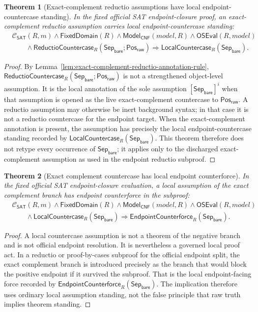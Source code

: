 \documentclass[11pt]{article}
\newtheorem{theorem}{Theorem}[section]
\theoremstyle{definition}
\theoremstyle{remark}
\newcommand{\PosRaw}{\mathsf{Pos}_{\mathsf{raw}}}
\newcommand{\SepBare}{\mathsf{Sep}_{\mathsf{bare}}}
\newcommand{\ClayCtx}{\mathcal{C}_{\mathsf{SAT}}(R,m)}
\newcommand{\FixedDom}{\mathsf{FixedDomain}}
\newcommand{\ModelOfCnf}{\mathsf{Model}_{\mathsf{CNF}}}
\newcommand{\OfficialSATEval}{\mathsf{OSEval}}
\newcommand{\EndpointCounterforce}{\mathsf{EndpointCounterforce}}
\newcommand{\LocalCountercase}{\mathsf{LocalCountercase}}
\newcommand{\ReductioCountercase}{\mathsf{ReductioCountercase}}
\begin{document}
\begin{theorem}[Exact-complement reductio assumptions have local endpoint-countercase standing]
\label{thm:reductio-countercase-yields-local-countercase}
In the fixed official SAT endpoint-closure proof, an exact-complement reductio assumption carries local endpoint-countercase standing:
\[
\begin{aligned}
  &\ClayCtx\wedge\FixedDom(R)\wedge\ModelOfCnf(model,R)\wedge\OfficialSATEval(R,model)\\
  &\qquad\wedge\ReductioCountercase_R(\SepBare;\PosRaw)\Rightarrow \LocalCountercase_R(\SepBare).
\end{aligned}
\]
\end{theorem}

\begin{proof}
By Lemma~\ref{lem:exact-complement-reductio-annotation-rule}, \(\ReductioCountercase_R(\SepBare;\PosRaw)\) is not a strengthened object-level assumption. It is the local annotation of the sole assumption \([\SepBare]^i\) when that assumption is opened as the live exact-complement countercase to \(\PosRaw\). A reductio assumption may otherwise be inert background syntax; in that case it is not a reductio countercase for the endpoint target. When the exact-complement annotation is present, the assumption has precisely the local endpoint-countercase standing recorded by \(\LocalCountercase_R(\SepBare)\). This theorem therefore does not retype every occurrence of \(\SepBare\); it applies only to the discharged exact-complement assumption as used in the endpoint reductio subproof.
\end{proof}

\begin{theorem}[Exact complement countercase has local endpoint counterforce]
\label{thm:local-countercase-has-endpoint-counterforce}
In the fixed official SAT endpoint-closure evaluation, a local assumption of the exact complement branch has endpoint counterforce in the subproof:
\[
\begin{aligned}
  &\ClayCtx\wedge\FixedDom(R)\wedge\ModelOfCnf(model,R)\wedge\OfficialSATEval(R,model)\\
  &\qquad\wedge\LocalCountercase_R(\SepBare)\Rightarrow \EndpointCounterforce_R(\SepBare).
\end{aligned}
\]
\end{theorem}

\begin{proof}
A local countercase assumption is not a theorem of the negative branch and is not official endpoint resolution. It is nevertheless a governed local proof act. In a reductio or proof-by-cases subproof for the official endpoint split, the exact complement branch is introduced precisely as the branch that would block the positive endpoint if it survived the subproof. That is the local endpoint-facing force recorded by \(\EndpointCounterforce_R(\SepBare)\). The implication therefore uses ordinary local assumption standing, not the false principle that raw truth implies theorem standing.
\end{proof}
\end{document}
